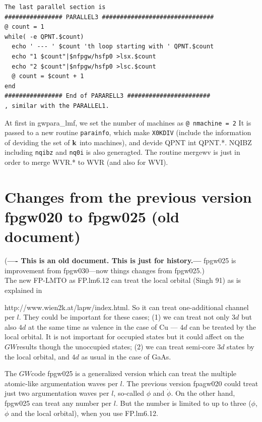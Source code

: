 \documentclass[a4paper,10pt,epsf,fleqn]{article}
\newcommand{\GW}{$GW$}
\newcommand{\bfk}{{\bf k}}
\newcommand{\io}[1]{{\sf  #1}}
\newcommand{\raw}[1]{{\tt #1}}
\begin{document}
{{{{\begin{verbatim}
The last parallel section is
################ PARALLEL3 ###############################
@ count = 1
while( -e QPNT.$count)
  echo ' --- ' $count 'th loop starting with ' QPNT.$count
  echo "1 $count"|$nfpgw/hsfp0 >lsx.$count
  echo "2 $count"|$nfpgw/hsfp0 >lsc.$count
  @ count = $count + 1
end
################ End of PARARELL3 #######################
, similar with the PARALLEL1.

\end{verbatim}}

At first in gwpara\_lmf, we set the number of machines as 
\verb#@ nmachine = 2#
It is passed to a new routine \raw{parainfo}, which make 
\raw{X0KDIV} (include the information of deviding the set of $\bfk$ into machines), 
and devide \io{QPNT} int \io{QPNT.*}. 
\io{NQIBZ} including \raw{nqibz} and \raw{nq0i} 
is also generagted. The routine mergewv is just in order to merge 
\io{WVR.*} to \io{WVR} (and also for \io{WVI}).



\section{Changes from the previous version fpgw020 to fpgw025 (old document)}

({\bf ---- This is an old document. This is just for history.---}
fpgw025 is improvement from fpgw030---now things changes from fpgw025.)\\

The new FP-LMTO as FP.lm6.12 can treat 
the local orbital (Singh 91) as is explained in 

\noindent http://www.wien2k.at/lapw/index.html.
So it can treat one-additional channel per $l$.
They could be important for these cases;
(1) we can treat not only $3d$ but also $4d$ at the same
time as valence in the case of Cu --- $4d$ can be treated 
by the local orbital. It is not important for occupied states 
but it could affect on the \GW results though
the unoccupied states; 
(2) we can treat semi-core $3d$ states by the local orbital,
and $4d$ as usual in the case of GaAs.


The \GW code fpgw025 is a generalized version which can treat
the multiple atomic-like argumentation waves per $l$.
The previous version fpagw020 could treat just 
two argumentation waves per $l$, so-called $\phi$ and $\dot{\phi}$.
On the other hand, fpgw025 can treat any number per $l$.
But the number is limited to up to three 
($\phi$, $\dot{\phi}$ and the local orbital), 
when you use FP.lm6.12. 

}}}
\end{document}
